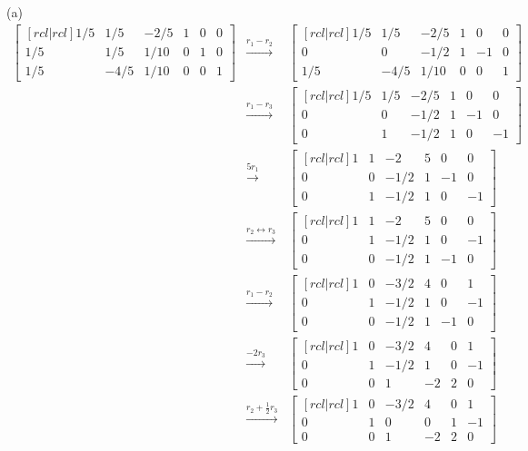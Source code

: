 \begin{solution}
(a)
\begin{eqnarray*}
\begin{bmatrix}[rcl|rcl]
1/5&1/5&-2/5&1&0&0\\
1/5&1/5&1/10&0&1&0\\
1/5&-4/5&1/10&0&0&1
\end{bmatrix}
&\xrightarrow[]{r_1 - r_2}&
\begin{bmatrix}[rcl|rcl]
1/5&1/5&-2/5&1&0&0\\
0&0&-1/2&1&-1&0\\
1/5&-4/5&1/10&0&0&1
\end{bmatrix}\\
&\xrightarrow[]{r_1 - r_3}&
\begin{bmatrix}[rcl|rcl]
1/5&1/5&-2/5&1&0&0\\
0&0&-1/2&1&-1&0\\
0&1&-1/2&1&0&-1
\end{bmatrix}\\
&\xrightarrow[]{5r_1}&
\begin{bmatrix}[rcl|rcl]
1&1&-2&5&0&0\\
0&0&-1/2&1&-1&0\\
0&1&-1/2&1&0&-1
\end{bmatrix}\\
&\xrightarrow[]{r_2 \leftrightarrow r_3}&
\begin{bmatrix}[rcl|rcl]
1&1&-2&5&0&0\\
0&1&-1/2&1&0&-1\\
0&0&-1/2&1&-1&0
\end{bmatrix}\\
&\xrightarrow[]{r_1- r_2}&
\begin{bmatrix}[rcl|rcl]
1&0&-3/2&4&0&1\\
0&1&-1/2&1&0&-1\\
0&0&-1/2&1&-1&0
\end{bmatrix}\\
&\xrightarrow[]{-2r_3}&
\begin{bmatrix}[rcl|rcl]
1&0&-3/2&4&0&1\\
0&1&-1/2&1&0&-1\\
0&0&1&-2&2&0
\end{bmatrix}\\
&\xrightarrow[]{r_2 + \frac{1}{2}r_3}&
\begin{bmatrix}[rcl|rcl]
1&0&-3/2&4&0&1\\
0&1&0&0&1&-1\\
0&0&1&-2&2&0
\end{bmatrix}\\

\end{eqnarray*}
\end{solution}
